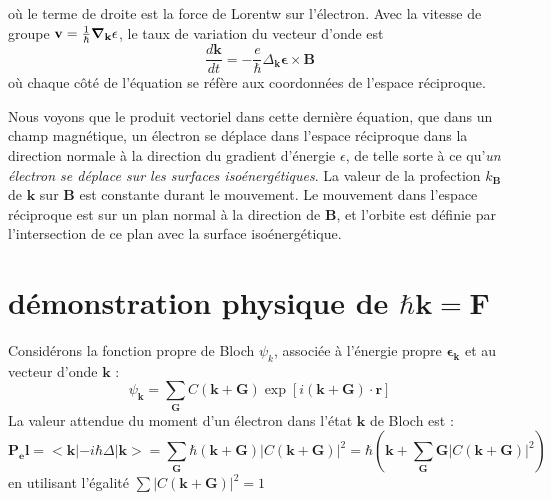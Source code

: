 où le terme de droite est la force de Lorentw sur l'électron. Avec la vitesse de
groupe $\mathbf{v} = \frac{1}{\hbar} \mbox{\boldmath$ \nabla $} _\mathbf{k}\mathbf{\epsilon}$, le taux
de variation du vecteur d'onde est
\begin{equation}
    \frac{d\mathbf{k}}{dt} = -\frac{e}{\hbar} \Delta_\mathbf{k}\mathbf{\epsilon}
    \times \mathbf{B}
\end{equation}
où chaque côté de l'équation se réfère aux coordonnées de l'espace réciproque.

Nous voyons que le produit vectoriel dans cette dernière équation, que dans un
champ magnétique, un électron se déplace dans l'espace réciproque dans la
direction normale à la direction du gradient d'énergie $\epsilon$, de telle sorte
à ce qu'\emph{un électron se déplace sur les surfaces isoénergétiques}. La valeur
de la profection $k_\mathbf{B}$ de $\mathbf{k}$ sur $\mathbf{B}$ est constante
durant le mouvement. Le mouvement dans l'espace réciproque est sur un plan normal
à la direction de $\mathbf{B}$, et l'orbite est définie par l'intersection de ce
plan avec la surface isoénergétique.

\section{démonstration physique de $\hbar \mathbf{k} = \mathbf{F}$}
Considérons la fonction propre de Bloch $\psi_k$, associée à l'énergie propre
$\mathbf{\epsilon_k}$ et au vecteur d'onde $\mathbf{k}$ :
\begin{equation}
    \psi_\mathbf{k} = \sum_\mathbf{G} C(\mathbf{k+G})\exp [i(\mathbf{k+G})\cdot
    \mathbf{r}]
\end{equation}
La valeur attendue du moment d'un électron dans l'état $\mathbf{k}$ de Bloch est
:
\begin{equation}
    \mathbf{P_el} = <\mathbf{k}|-i\hbar\Delta|\mathbf{k}> = \sum_\mathbf{G} \hbar
    (\mathbf{k+G}) |C(\mathbf{k+G})|^2 = \hbar (\mathbf{k} + \sum_\mathbf{G}
    \mathbf{G}|C(\mathbf{k+G})|^2)
\end{equation}
en utilisant l'égalité $\sum |C(\mathbf{k+G})|^2 = 1$

